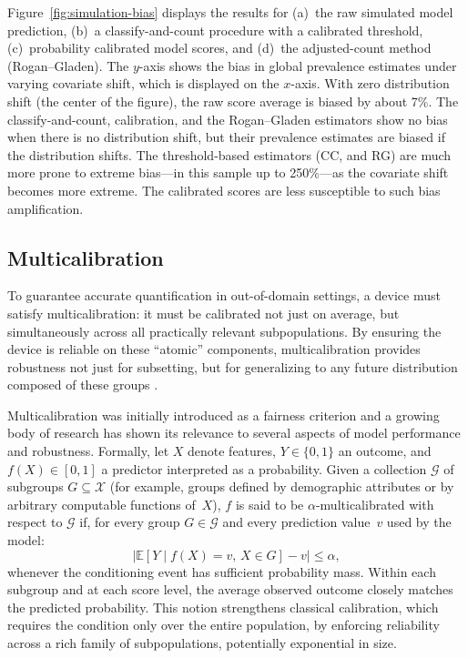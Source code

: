 \documentclass[12pt]{article}
\begin{document}
Figure~\ref{fig:simulation-bias} displays the results for (a)~the raw
simulated model prediction, (b)~a classify-and-count procedure with a
calibrated threshold, (c)~probability calibrated model scores, and (d)~the
adjusted-count method (Rogan--Gladen). The $y$-axis shows the bias in
global prevalence estimates under varying covariate shift, which is
displayed on the $x$-axis. With zero distribution shift (the center of the
figure), the raw score average is biased by about 7\%. The
classify-and-count, calibration, and the Rogan--Gladen estimators show no
bias when there is no distribution shift, but their prevalence estimates
are biased if the distribution shifts. The threshold-based estimators (CC,
and RG) are much more prone to extreme bias---in this sample up to
250\%---as the covariate shift becomes more extreme. The calibrated scores
are less susceptible to such bias amplification.

\subsection{Multicalibration}

To guarantee accurate quantification in out-of-domain settings, a device
must satisfy multicalibration: it must be calibrated not just on average,
but simultaneously across all practically relevant subpopulations. By
ensuring the device is reliable on these ``atomic'' components,
multicalibration provides robustness not just for subsetting, but for
generalizing to any future distribution composed of these groups
\citep{gopalan2022omnipredictors}.

Multicalibration was initially introduced as a fairness criterion
\citep{hebertjohnson2018multicalibration, blasiok2023loss} and a growing
body of research has shown its relevance to several aspects of model
performance and robustness. Formally, let $X$ denote features, $Y \in
\{0,1\}$ an outcome, and $f(X) \in [0,1]$ a predictor interpreted as a
probability. Given a collection $\mathcal{G}$ of subgroups $G \subseteq
\mathcal{X}$ (for example, groups defined by demographic attributes or by
arbitrary computable functions of~$X$), $f$ is said to be
$\alpha$-multicalibrated with respect to $\mathcal{G}$ if, for every group
$G \in \mathcal{G}$ and every prediction value~$v$ used by the model:
\[
  \left| \mathbb{E}[Y \mid f(X)=v,\, X \in G] - v \right| \le \alpha,
\]
whenever the conditioning event has sufficient probability mass. Within
each subgroup and at each score level, the average observed outcome closely
matches the predicted probability. This notion strengthens classical
calibration, which requires the condition only over the entire population,
by enforcing reliability across a rich family of subpopulations,
potentially exponential in size.
\end{document}
